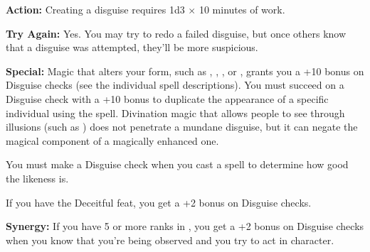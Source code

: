 \textbf{Action:} Creating a disguise requires 1d3 $\times$ 10 minutes of work.

\textbf{Try Again:} Yes. You may try to redo a failed disguise, but once others know that a disguise was attempted, they'll be more suspicious.

\textbf{Special:} Magic that alters your form, such as , , , or , grants you a +10 bonus on Disguise checks (see the individual spell descriptions). You must succeed on a Disguise check with a +10 bonus to duplicate the appearance of a specific individual using the  spell. Divination magic that allows people to see through illusions (such as ) does not penetrate a mundane disguise, but it can negate the magical component of a magically enhanced one.

You must make a Disguise check when you cast a  spell to determine how good the likeness is.

If you have the Deceitful feat, you get a +2 bonus on Disguise checks.

\textbf{Synergy:} If you have 5 or more ranks in , you get a +2 bonus on Disguise checks when you know that you're being observed and you try to act in character.